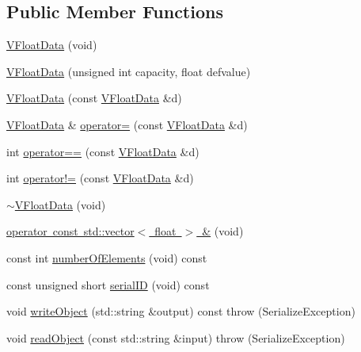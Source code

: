 \subsection*{Public Member Functions}
\begin{DoxyCompactItemize}
\item 
\mbox{\hyperlink{classFILEDB_1_1VFloatData_a25f93b52c82fdc6299e386be3e251912}{V\+Float\+Data}} (void)
\item 
\mbox{\hyperlink{classFILEDB_1_1VFloatData_a27b94ed1e86096f64166bcd712b2ae94}{V\+Float\+Data}} (unsigned int capacity, float defvalue)
\item 
\mbox{\hyperlink{classFILEDB_1_1VFloatData_af51a333fc7a5e7aa94f75656efaa83c6}{V\+Float\+Data}} (const \mbox{\hyperlink{classFILEDB_1_1VFloatData}{V\+Float\+Data}} \&d)
\item 
\mbox{\hyperlink{classFILEDB_1_1VFloatData}{V\+Float\+Data}} \& \mbox{\hyperlink{classFILEDB_1_1VFloatData_a8aecd0607b79c41f846510307450fa47}{operator=}} (const \mbox{\hyperlink{classFILEDB_1_1VFloatData}{V\+Float\+Data}} \&d)
\item 
int \mbox{\hyperlink{classFILEDB_1_1VFloatData_ac6cbdff5219aeabc1e182721ff9d6d7c}{operator==}} (const \mbox{\hyperlink{classFILEDB_1_1VFloatData}{V\+Float\+Data}} \&d)
\item 
int \mbox{\hyperlink{classFILEDB_1_1VFloatData_ab54605c8c5239fc22b85c4514ced5a24}{operator!=}} (const \mbox{\hyperlink{classFILEDB_1_1VFloatData}{V\+Float\+Data}} \&d)
\item 
\mbox{\hyperlink{classFILEDB_1_1VFloatData_a94f96be436999db58bfbff512cda6d63}{$\sim$\+V\+Float\+Data}} (void)
\item 
\mbox{\hyperlink{classFILEDB_1_1VFloatData_a9ac82e245522972ecb6667ec078336b5}{operator const std\+::vector$<$ float $>$ \&}} (void)
\item 
const int \mbox{\hyperlink{classFILEDB_1_1VFloatData_a1ef52e51516fd02fa123199c63cef647}{number\+Of\+Elements}} (void) const
\item 
const unsigned short \mbox{\hyperlink{classFILEDB_1_1VFloatData_a63b06bc5c69783fcbb4ab699b2633815}{serial\+ID}} (void) const
\item 
void \mbox{\hyperlink{classFILEDB_1_1VFloatData_afad9c7e520cdd7bf9ae0b477b8a5f1f1}{write\+Object}} (std\+::string \&output) const  throw (\+Serialize\+Exception)
\item 
void \mbox{\hyperlink{classFILEDB_1_1VFloatData_ae217975cba234df3601c065669f26f38}{read\+Object}} (const std\+::string \&input)  throw (\+Serialize\+Exception)

\end{DoxyCompactItemize}
